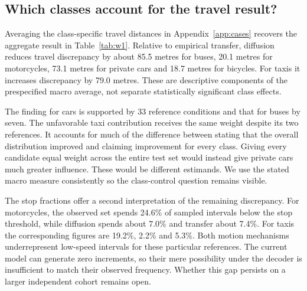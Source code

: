 \subsection{Which classes account for the travel result?}
Averaging the class-specific travel distances in Appendix~\ref{app:cases} recovers the aggregate result in Table~\ref{tab:w1}. Relative to empirical transfer, diffusion reduces travel discrepancy by about 85.5 metres for buses, 20.1 metres for motorcycles, 73.1 metres for private cars and 18.7 metres for bicycles. For taxis it increases discrepancy by 79.0 metres. These are descriptive components of the prespecified macro average, not separate statistically significant class effects.

The finding for cars is supported by 33 reference conditions and that for buses by seven. The unfavorable taxi contribution receives the same weight despite its two references. It accounts for much of the difference between stating that the overall distribution improved and claiming improvement for every class. Giving every candidate equal weight across the entire test set would instead give private cars much greater influence. These would be different estimands. We use the stated macro measure consistently so the class-control question remains visible.

The stop fractions offer a second interpretation of the remaining discrepancy. For motorcycles, the observed set spends 24.6\% of sampled intervals below the stop threshold, while diffusion spends about 7.0\% and transfer about 7.4\%. For taxis the corresponding figures are 19.2\%, 2.2\% and 5.3\%. Both motion mechanisms underrepresent low-speed intervals for these particular references. The current model can generate zero increments, so their mere possibility under the decoder is insufficient to match their observed frequency. Whether this gap persists on a larger independent cohort remains open.
